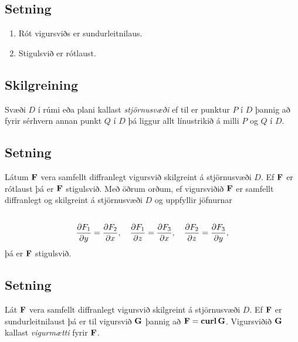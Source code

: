 \documentclass[a4paper,10pt,icelandic]{sphinxmanual}
\begin{document}
\subsection{Setning}
\label{Kafli6:setning}\begin{enumerate}
\item {} 
Rót vigursviðs er sundurleitnilaus.

\item {} 
Stigulsvið er rótlaust.

\end{enumerate}


\subsection{Skilgreining}
\label{Kafli6:id4}
Svæði \(D\) í rúmi eða plani kallast \emph{stjörnusvæði} ef til er
punktur \(P\) í \(D\) þannig að fyrir sérhvern annan punkt
\(Q\) í \(D\) þá liggur allt línustrikið á milli \(P\) og
\(Q\) í \(D\).


\subsection{Setning}
\label{Kafli6:id5}
Látum \(\mbox{${\bf F}$}\) vera samfellt diffranlegt vigursvið
skilgreint á stjörnusvæði \(D\). Ef \(\mbox{${\bf F}$}\) er
rótlaust þá er \(\mbox{${\bf F}$}\) stigulsvið. Með öðrum orðum, ef
vigursviðið \(\mbox{${\bf F}$}\) er samfellt diffranlegt og
skilgreint á stjörnusvæði \(D\) og uppfyllir jöfnurnar
\begin{gather}
\begin{split}\displaystyle\end{split}\notag\\\begin{split}\frac{\partial F_1}{\partial y}=
\frac{\partial F_2}{\partial x},\quad
\frac{\partial F_1}{\partial z}=
\frac{\partial F_3}{\partial x},\quad
\frac{\partial F_2}{\partial z}=
\frac{\partial F_3}{\partial y},\end{split}\notag
\end{gather}
þá er \(\mbox{${\bf F}$}\) stigulsvið.


\subsection{Setning}
\label{Kafli6:id6}
Lát \(\mbox{${\bf F}$}\) vera samfellt diffranlegt vigursvið
skilgreint á stjörnusvæði \(D\). Ef \(\mbox{${\bf F}$}\) er
sundurleitnilaust þá er til vigursvið \(\mbox{${\bf G}$}\) þannig að
\(\mbox{${\bf F}$}=\mbox{${\rm\bf curl\,}$}\mbox{${\bf G}$}\).
Vigursviðið \(\mbox{${\bf G}$}\) kallast \emph{vigurmætti} fyrir
\(\mbox{${\bf F}$}\).
\end{document}
